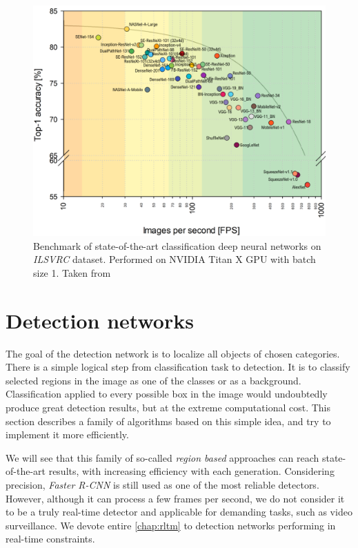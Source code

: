 \begin{figure}
    \includegraphics[width=\textwidth]{img/fps_comp}
    \caption{Benchmark of state-of-the-art classification deep neural networks on \textit{ILSVRC} dataset. Performed on NVIDIA
Titan X GPU with batch size 1. Taken from \cite[fig. 3]{bib:cnnbenchmark}}
    \label{fig:cnnbenchmark}
\end{figure}



\section{Detection networks}
\label{sec:detnets}
The goal of the detection network is to localize all objects of chosen categories. There is a simple logical step from classification task to detection. It is to classify selected regions in the image as one of the classes or as a background. Classification applied to every possible box in the image would undoubtedly produce great detection results, but at the extreme computational cost. This section describes a family of algorithms based on this simple idea, and try to implement it more efficiently.

We will see that this family of so-called \textit{region based} approaches can reach state-of-the-art results, with increasing efficiency with each generation. Considering precision, \textit{Faster R-CNN} is still used as one of the most reliable detectors. However, although it can process a few frames per second, we do not consider it to be a truly real-time detector and applicable for demanding tasks, such as video surveillance. We devote entire \cref{chap:rltm} to detection networks performing in real-time constraints.

